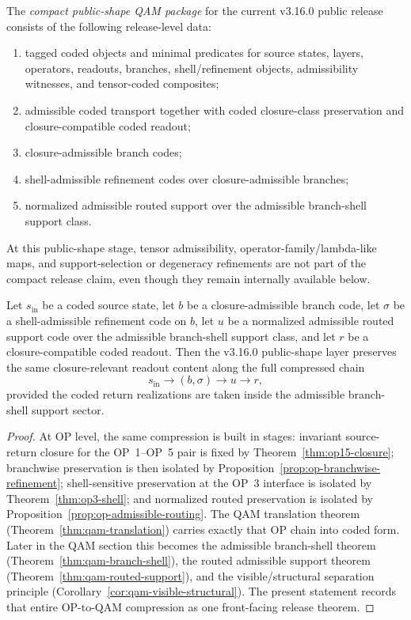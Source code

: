 \begin{definition}
The \emph{compact public-shape QAM package} for the current v3.16.0 public release consists of the following release-level data:
\begin{enumerate}[leftmargin=2em]
  \item tagged coded objects and minimal predicates for source states, layers, operators, readouts, branches, shell/refinement objects, admissibility witnesses, and tensor-coded composites;
  \item admissible coded transport together with coded closure-class preservation and closure-compatible coded readout;
  \item closure-admissible branch codes;
  \item shell-admissible refinement codes over closure-admissible branches;
  \item normalized admissible routed support over the admissible branch-shell support class.
\end{enumerate}
At this public-shape stage, tensor admissibility, operator-family/lambda-like maps, and support-selection or degeneracy refinements are not part of the compact release claim, even though they remain internally available below.
\end{definition}

\begin{theorem}\label{thm:compact-public-shape-preservation}
Let $s_{\mathrm{in}}$ be a coded source state, let $b$ be a closure-admissible branch code, let $\sigma$ be a shell-admissible refinement code on $b$, let $u$ be a normalized admissible routed support code over the admissible branch-shell support class, and let $r$ be a closure-compatible coded readout. Then the v3.16.0 public-shape layer preserves the same closure-relevant readout content along the full compressed chain
\[
s_{\mathrm{in}}
\longrightarrow
(b,\sigma)
\longrightarrow
u
\longrightarrow
r,
\]
provided the coded return realizations are taken inside the admissible branch-shell support sector.
\end{theorem}

\begin{proof}
At OP level, the same compression is built in stages: invariant source-return closure for the OP~1--OP~5 pair is fixed by Theorem~\ref{thm:op15-closure}; branchwise preservation is then isolated by Proposition~\ref{prop:op-branchwise-refinement}; shell-sensitive preservation at the OP~3 interface is isolated by Theorem~\ref{thm:op3-shell}; and normalized routed preservation is isolated by Proposition~\ref{prop:op-admissible-routing}. The QAM translation theorem (Theorem~\ref{thm:qam-translation}) carries exactly that OP chain into coded form. Later in the QAM section this becomes the admissible branch-shell theorem (Theorem~\ref{thm:qam-branch-shell}), the routed admissible support theorem (Theorem~\ref{thm:qam-routed-support}), and the visible/structural separation principle (Corollary~\ref{cor:qam-visible-structural}). The present statement records that entire OP-to-QAM compression as one front-facing release theorem.
\end{proof}

